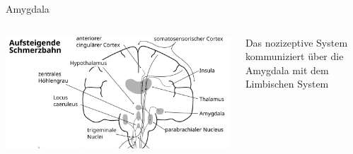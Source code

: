 \documentclass{beamer}
\begin{document}
\begin{frame}{Amygdala}
    
    \begin{columns}[c]
    
    \begin{column}{6cm}
    
    \begin{center}
        \includegraphics[width=\textwidth]{Schmerz_aufsteigend_Gehirn.png}
    
    \end{center}
    
    \end{column}

    \begin{column}{5cm}

Das nozizeptive System kommuniziert über die Amygdala mit dem Limbischen System  \\ [0.5 cm]


    
    \end{column}

    
    \end{columns}
    
\end{frame}





\end{document}
